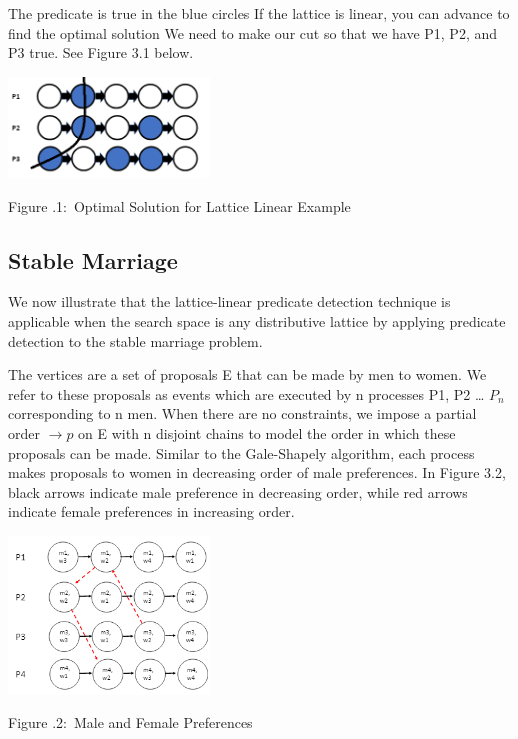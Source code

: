 \documentclass[twoside]{article}
\newcounter{lecnum}
\newcommand{\fig}[3]{
			\vspace{#2}
			\begin{center}
			Figure \thelecnum.#1:~#3
			\end{center}
	}
\begin{document}
The predicate is true in the blue circles \newline
If the lattice is linear, you can advance to find the optimal solution \newline
We need to make our cut so that we have P1, P2, and P3 true. See Figure 3.1 below. \newline
\begin{center}
\includegraphics[width=0.4\textwidth]{figure_1_bubbles_with_G.PNG}
\end{center}
\fig{1}{4}{Optimal Solution for Lattice Linear Example}

\subsection{Stable Marriage}
We now illustrate that the lattice-linear predicate detection technique is applicable when the search space is any distributive lattice by applying predicate detection to the stable marriage problem.\newline

The vertices are a set of proposals E that can be made by men to women. We refer to these proposals as events which are executed by n processes {P1, P2 … $P_n$} corresponding to n men. When there are no constraints, we impose a partial order  $\rightarrow p $ on E with n disjoint chains to model the order in which these proposals can be made. Similar to the Gale-Shapely algorithm, each process makes proposals to women in decreasing order of male preferences. In Figure 3.2, black arrows indicate male preference in decreasing order, while red arrows indicate female preferences in increasing order.\newline

\begin{center}
\includegraphics[width=0.4\textwidth]{figure_2_wpref.PNG}
\end{center}
\fig{2}{4}{Male and Female Preferences}
 
\end{document}
